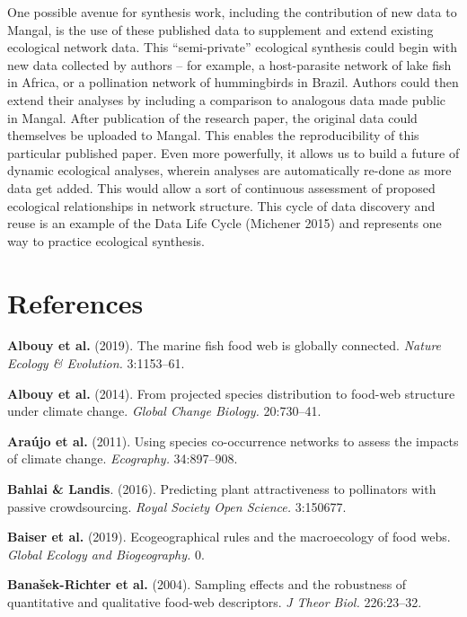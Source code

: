One possible avenue for synthesis work, including the contribution of
new data to Mangal, is the use of these published data to supplement and
extend existing ecological network data. This ``semi-private''
ecological synthesis could begin with new data collected by authors --
for example, a host-parasite network of lake fish in Africa, or a
pollination network of hummingbirds in Brazil. Authors could then extend
their analyses by including a comparison to analogous data made public
in Mangal. After publication of the research paper, the original data
could themselves be uploaded to Mangal. This enables the reproducibility
of this particular published paper. Even more powerfully, it allows us
to build a future of dynamic ecological analyses, wherein analyses are
automatically re-done as more data get added. This would allow a sort of
continuous assessment of proposed ecological relationships in network
structure. This cycle of data discovery and reuse is an example of the
Data Life Cycle (Michener 2015) and represents one way to practice
ecological synthesis.

\hypertarget{references}{%
\section*{References}\label{references}}

\hypertarget{refs}{}
\leavevmode\hypertarget{ref-AlboArch19}{}%
\textbf{Albouy et al.} (2019). The marine fish food web is globally
connected. \emph{Nature Ecology \& Evolution.} 3:1153--61.

\leavevmode\hypertarget{ref-AlboVele14}{}%
\textbf{Albouy et al.} (2014). From projected species distribution to
food-web structure under climate change. \emph{Global Change Biology.}
20:730--41.

\leavevmode\hypertarget{ref-ArauRoze11}{}%
\textbf{Araújo et al.} (2011). Using species co-occurrence networks to
assess the impacts of climate change. \emph{Ecography.} 34:897--908.

\leavevmode\hypertarget{ref-BahlLand16}{}%
\textbf{Bahlai \& Landis}. (2016). Predicting plant attractiveness to
pollinators with passive crowdsourcing. \emph{Royal Society Open
Science.} 3:150677.

\leavevmode\hypertarget{ref-BaisGrav19}{}%
\textbf{Baiser et al.} (2019). Ecogeographical rules and the
macroecology of food webs. \emph{Global Ecology and Biogeography.} 0.

\leavevmode\hypertarget{ref-BanaCatt04}{}%
\textbf{Banašek-Richter et al.} (2004). Sampling effects and the
robustness of quantitative and qualitative food-web descriptors. \emph{J
Theor Biol.} 226:23--32.

